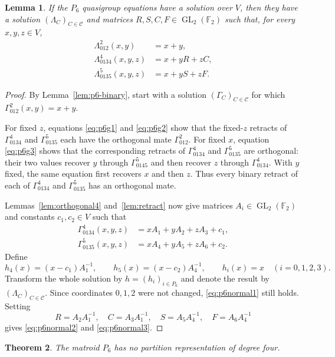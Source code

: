 \documentclass[preprint,12pt]{elsarticle}
\newtheorem{theorem}{Theorem}[section]
\newtheorem{lemma}[theorem]{Lemma}
\theoremstyle{definition}
\newcommand{\F}{\mathbb F}
\newcommand{\GL}{\operatorname{GL}}
\begin{document}
\begin{lemma}\label{lem:p6-ternary}
If the $P_6$ quasigroup equations have a solution over $V$, then they have a
solution $(\Lambda_C)_{C\in\mathcal C}$ and matrices
$R,S,C,F\in\GL_2(\F_2)$ such that, for every $x,y,z\in V$,
\begin{align}
\Lambda_{012}^{2}(x,y)&=x+y,\label{eq:p6normal1}\\
\Lambda_{0134}^{4}(x,y,z)&=x+yR+zC,\label{eq:p6normal2}\\
\Lambda_{0135}^{5}(x,y,z)&=x+yS+zF.\label{eq:p6normal3}
\end{align}
\end{lemma}

\begin{proof}
By Lemma~\ref{lem:p6-binary}, start with a solution
$(\Gamma_C)_{C\in\mathcal C}$ for which
$\Gamma_{012}^{2}(x,y)=x+y$.

For fixed $z$, equations \eqref{eq:p6g1} and \eqref{eq:p6g2} show that the
fixed-$z$ retracts of $\Gamma_{0134}^{4}$ and $\Gamma_{0135}^{5}$ each have
the orthogonal mate $\Gamma_{012}^{2}$. For fixed $x$, equation
\eqref{eq:p6g3} shows that the corresponding retracts of
$\Gamma_{0134}^{4}$ and $\Gamma_{0135}^{5}$ are orthogonal: their two values
recover $y$ through $\Gamma_{0145}^{5}$ and then recover $z$ through
$\Gamma_{0134}^{4}$. With $y$ fixed, the same equation first recovers $x$
and then $z$. Thus every binary retract of each of
$\Gamma_{0134}^{4}$ and $\Gamma_{0135}^{5}$ has an orthogonal mate.

Lemmas~\ref{lem:orthogonal4} and~\ref{lem:retract} now give matrices
$A_i\in\GL_2(\F_2)$ and constants $c_1,c_2\in V$ such that
\begin{align*}
\Gamma_{0134}^{4}(x,y,z)&=xA_1+yA_2+zA_3+c_1,\\
\Gamma_{0135}^{5}(x,y,z)&=xA_4+yA_5+zA_6+c_2.
\end{align*}
Define
\[
h_4(x)=(x-c_1)A_1^{-1},\qquad
h_5(x)=(x-c_2)A_4^{-1},\qquad
h_i(x)=x\quad(i=0,1,2,3).
\]
Transform the whole solution by $h=(h_i)_{i\in P_6}$ and denote the result
by $(\Lambda_C)_{C\in\mathcal C}$. Since coordinates $0,1,2$ were not
changed, \eqref{eq:p6normal1} still holds. Setting
\[
R=A_2A_1^{-1},\quad C=A_3A_1^{-1},\quad
S=A_5A_4^{-1},\quad F=A_6A_4^{-1}
\]
gives \eqref{eq:p6normal2} and \eqref{eq:p6normal3}.
\end{proof}


\begin{theorem}\label{lem:p6}
The matroid $P_6$ has no partition representation of degree four.
\end{theorem}
\end{document}
